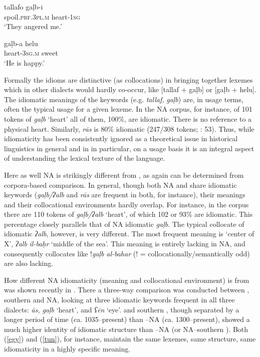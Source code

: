 \documentclass[output=paper]{langsci/langscibook}
\begin{document}
\ea\label{galb}
\ea
\gll tallafo gaḷb-i\\
     spoil.\textsc{prf.3pl.m} heart-1\textsc{sg}\\
\glt ‘They angered me.’

\ex
\gll gaḷb-a helu\\
     heart-\textsc{3sg.m} sweet\\
\glt ‘He is happy.’\label{helu}
\z
\z

Formally the {idioms} are distinctive (as  collocations) in bringing together lexemes which in other dialects would hardly co-occur, like [tallaf + gaḷb] or [gaḷb + helu]. The {idiomatic} meanings of the keywords (e.g. \textit{tallaf,} \textit{gaḷb}) are, in usage terms, often the typical usage for a given lexeme. In the NA corpus, for instance, of 101 tokens of \textit{gaḷb} ‘heart’ all of them, 100\%, are {idiomatic}. There is no reference to a physical heart. Similarly, \textit{rās} is 80\% {idiomatic} (247/308 tokens; \citealt{Ritt-Benmimounetc2017}: 53). Thus, while {idiomaticity} has been consistently ignored as a theoretical issue in historical linguistics in general and in  in particular, on a usage basis it is an integral aspect of understanding the lexical texture of the language.


Here as well NA is strikingly different from , as again can be determined from corpora-based comparison. In general, though both NA and  share {idiomatic} keywords (\textit{gaḷb/ʔalb} and \textit{rās} are frequent in both, for instance), their meanings and their collocational environments hardly overlap. For instance, in the  corpus there are 110 tokens of \textit{gaḷb/ʔalb} ‘heart’, of which 102 or 93\% are {idiomatic}. This percentage closely parallels that of NA {idiomatic} \textit{gaḷb}. The typical  {collocate} of {idiomatic} \textit{ʔalb}, however, is very different. The most frequent meaning is ‘center of X’, \textit{ʔalb} \textit{il-baḥr} ‘middle of the sea’. This meaning is entirely lacking in NA, and consequently {collocates} like !\textit{gaḷb} \textit{al-bahar} (! = collocationally/semantically odd) are also lacking.

How different NA {idiomaticity} (meaning and collocational environment) is from  was shown recently in \citet{Ritt-Benmimounetc2017}. There a three-way comparison was conducted between , southern   and NA, looking at three {idiomatic} keywords frequent in all three dialects: \textit{{\R}ās,} \textit{gaḷb} ‘heart’, and \textit{ʕēn} ‘eye’.  and southern , though separated by a longer period of time (ca. 1035–present) than –NA (ca. 1300–present), showed a much higher {identity} of {idiomatic} structure than –NA (or NA–southern ). Both  (\ref{egy}) and   (\ref{tun}), for instance, maintain the same lexemes, same structure, same {idiomaticity} in a highly specific meaning.
\end{document}
